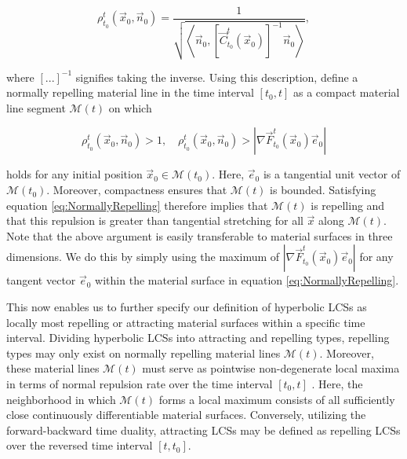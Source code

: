 \begin{equation}
	\rho_{t_0}^t(\vec{x}_0,\vec{n}_0) = \frac{1}{\sqrt{\left\langle \vec{n}_0, \left[\vec{C}_{t_0}^t(\vec{x}_0)\right]^{-1}\vec{n}_0 \right\rangle}},
\end{equation}

\noindent where $[...]^{-1}$ signifies taking the inverse. Using this description, \cite{Haller12} define a normally repelling material line in the time interval $[t_0,t]$ as a compact material line segment $\mathcal{M}(t)$ on which 

\begin{equation}\label{eq:NormallyRepelling}
	\rho_{t_0}^t(\vec{x}_0,\vec{n}_0) > 1, \quad \rho_{t_0}^t(\vec{x}_0,\vec{n}_0) > |\nabla \vec{F}_{t_0}^t(\vec{x}_0) \vec{e}_0|
\end{equation}

\noindent holds for any initial position $\vec{x}_0\in \mathcal{M}(t_0)$. Here, $\vec{e}_0$ is a tangential unit vector of $\mathcal{M}(t_0)$. Moreover, compactness ensures that $\mathcal{M}(t)$ is bounded. Satisfying equation \eqref{eq:NormallyRepelling} therefore implies that $\mathcal{M}(t)$ is repelling and that this repulsion is greater than tangential stretching for all $\vec{x}$ along $\mathcal{M}(t)$. Note that the above argument is easily transferable to material surfaces in three dimensions. We do this by simply using the maximum of $|\nabla \vec{F}_{t_0}^t(\vec{x}_0) \vec{e}_0|$ for any tangent vector $\vec{e}_0$ within the material surface in equation \eqref{eq:NormallyRepelling}.

This now enables us to further specify our definition of hyperbolic LCSs as locally most repelling or attracting material surfaces within a specific time interval. Dividing hyperbolic LCSs into attracting and repelling types, repelling types may only exist on normally repelling material lines $\mathcal{M}(t)$. Moreover, these material lines $\mathcal{M}(t)$ must serve as pointwise non-degenerate local maxima in terms of normal repulsion rate over the time interval $[t_0,t]$ \citep{Haller12}. Here, the neighborhood in which $\mathcal{M}(t)$ forms a local maximum consists of all sufficiently close continuously differentiable material surfaces. Conversely, utilizing the forward-backward time duality, attracting LCSs may be defined as repelling LCSs over the reversed time interval $[t,t_0]$.

